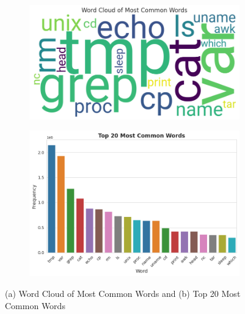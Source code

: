         \vspace{-0.5cm}

        \begin{figure}[h]
            \centering
            \begin{subfigure}[c]{0.47\textwidth}
                \centering
                \includegraphics[width=\textwidth]{../figures/plots/section1/word_cloud_of_most_common_words.png}
                \label{fig:word-cloud}
            \end{subfigure}
            \hfill
            \begin{subfigure}[c]{0.47\textwidth}
                \centering
                \includegraphics[width=\textwidth]{../figures/plots/section1/top_10_most_common_words.png}
                \label{fig:common-words}
            \end{subfigure}
            \vspace{-0.6cm}
            \caption{(a) Word Cloud of Most Common Words and (b) Top 20 Most Common Words}
            \label{fig:common-words-comparison}
        \end{figure}

